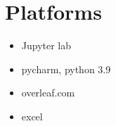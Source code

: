 \documentclass{article}
\begin{document}
\section{Platforms}
\begin{itemize}
\item Jupyter lab
\item pycharm, python 3.9
\item overleaf.com
\item excel
\end{itemize}
\end{document}
